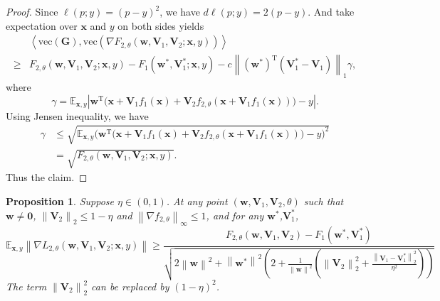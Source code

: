 \documentclass{article}
\theoremstyle{plain}
\newtheorem{prop}{Proposition}
\theoremstyle{definition}
\newcommand{\norm}[1]{\left\lVert#1\right\rVert}
\newcommand{\abs}[1]{\left|#1\right|}
\newcommand{\dis}{\displaystyle}
\newcommand{\iprod}[2]{\left\langle #1,#2 \right\rangle}
\begin{document}
\begin{proof}
    Since $\ell(p;y)=(p-y)^2$, we have $d\ell(p;y)=2(p-y)$. And take expectation over $\mathbf{x}$ and $y$ on both sides yields
    \begin{align*}
    &\iprod{\text{vec}(\mathbf{G})}
        {\text{vec}\left(\nabla F_{2,\theta}(\mathbf{w},\mathbf{V}_1,\mathbf{V}_2;\mathbf{x},y)\right)}\\
    \geq & F_{2,\theta}(\mathbf{w},\mathbf{V}_1,\mathbf{V}_2;\mathbf{x},y)
    -F_1(\mathbf{w}^*,\mathbf{V}_1^*;\mathbf{x},y)
        -c\norm{\left(\mathbf{w}^*\right)^\mathrm{T}\left(\mathbf{V}_1^*-\mathbf{V}_1\right)}_1\gamma,
    \end{align*}
    where
    \[
        \gamma=\mathbb{E}_{\mathbf{x},y}
        \abs{\mathbf{w}^\mathrm{T}\big(\mathbf{x}+\mathbf{V}_1f_1(\mathbf{x})
        +\mathbf{V}_2f_{2,\theta}\left(\mathbf{x}+\mathbf{V}_1f_1(\mathbf{x})\right)\big)-y}.
    \]
    Using Jensen inequality, we have
    \begin{align*}
        \gamma & \leq \sqrt{\mathbb{E}_{\mathbf{x},y}
        \Big(\mathbf{w}^\mathrm{T}\big(\mathbf{x}+\mathbf{V}_1f_1(\mathbf{x})
        +\mathbf{V}_2f_{2,\theta}\left(\mathbf{x}+\mathbf{V}_1f_1(\mathbf{x})\right)\big)-y\Big)^2}\\
        & = \sqrt{F_{2,\theta}(\mathbf{w},\mathbf{V}_1,\mathbf{V}_2;\mathbf{x},y)}.
    \end{align*}
    Thus the claim.
\end{proof}

\begin{prop}
	Suppose $\eta\in(0,1)$. At any point $(\mathbf{w},\mathbf{V}_1,\mathbf{V}_2,\theta)$ such that $\mathbf{w}\neq\mathbf{0}$, $\norm{\mathbf{V}_2}_2\leq 1-\eta$ and $\norm{\nabla f_{2,\theta}}_\infty\leq 1$, and for any $\mathbf{w}^*$,$\mathbf{V}_1^*$,
	\[\mathbb{E}_{\mathbf{x},y}\norm{\nabla L_{2,\theta}(\mathbf{w},\mathbf{V}_1,\mathbf{V}_2;\mathbf{x},y)}\geq\frac{F_{2,\theta}(\mathbf{w},\mathbf{V}_1,\mathbf{V}_2)-F_1(\mathbf{w}^*,\mathbf{V}_1^*)}{\sqrt{2\norm{\mathbf{w}}^2+\norm{\mathbf{w}^*}^2\left(2+\dis\frac{1}{\norm{\mathbf{w}}^2}\left(\norm{\mathbf{V}_2}_2^2+\frac{\norm{\mathbf{V}_1-\mathbf{V}_1^*}_2^2}{\eta^2}\right)\right)}}\]
	The term $\norm{\mathbf{V}_2}_2^2$ can be replaced by $(1-\eta)^2$.
\end{prop}
\end{document}
